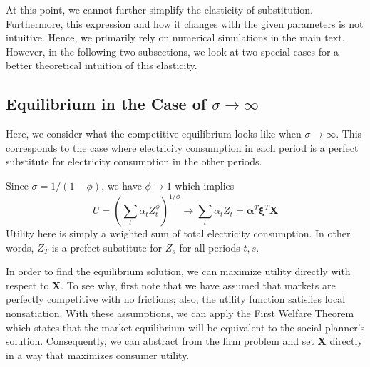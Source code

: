 \documentclass[11pt,a4paper,leqno]{extarticle}
\begin{document}
	At this point, we cannot further simplify the elasticity of substitution. Furthermore, this expression and how it changes with the given parameters is not intuitive. Hence, we primarily rely on numerical simulations in the main text. However, in the following two subsections, we look at two special cases for a better theoretical intuition of this elasticity. 
	
	\subsection{Equilibrium in the Case of $\sigma \to \infty $}
	
	Here, we consider what the competitive equilibrium looks like when $\sigma \to \infty$. This corresponds to the case where electricity consumption in each period is a perfect substitute for electricity consumption in the other periods. 
	
	Since $\sigma = 1/(1-\phi)$, we have $\phi \to 1$ which implies
	$$  U = \left( \sum_t \alpha_t Z_t^\phi  \right)^{1/\phi} \to  \sum_t \alpha_t Z_t = \boldsymbol{\alpha}^T \boldsymbol{\xi}^T \mathbf{X}$$
	Utility  here is simply a weighted sum of total electricity consumption. In other words, $Z_T$ is a prefect substitute for $Z_s$ for all periods $t,s$. 
	
	In order to find the equilibrium solution, we can maximize utility directly with respect to $\mathbf{X}$. To see why, first note that we have assumed that markets are perfectly competitive with no frictions; also, the utility function satisfies local  nonsatiation. With these assumptions, we can apply the First Welfare Theorem which states that the market equilibrium will be equivalent to the social planner's solution. Consequently, we can abstract from the firm problem and set $\mathbf{X}$ directly in a way that maximizes consumer utility. 
	
\end{document}
